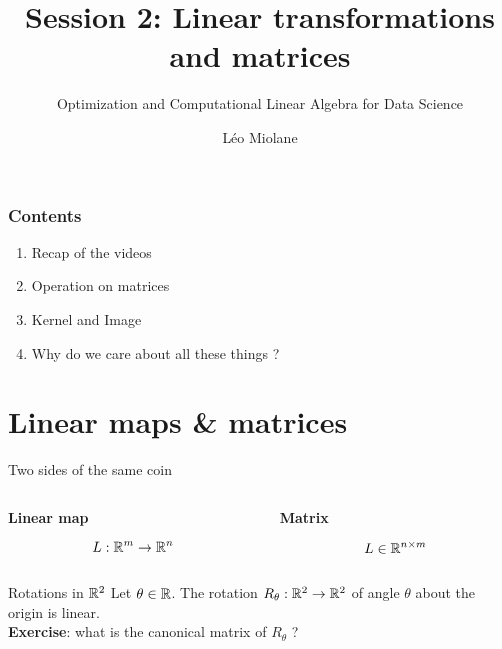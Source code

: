 \documentclass{beamer}
\title{Session 2: Linear transformations and matrices}
\subtitle{Optimization and Computational Linear Algebra for Data Science}
\author{Léo Miolane}
\date{}
\begin{document}
\setcounter{showProgressBar}{0}
\setcounter{showSlideNumbers}{0}

\frame{\titlepage}

\begin{frame}
	\frametitle{Contents}
	\begin{enumerate}
		\item Recap of the videos
		\item Operation on matrices
		\item Kernel and Image
		\item Why do we care about all these things ? 
	\end{enumerate}
\end{frame}


\setcounter{framenumber}{0}
\setcounter{showSlideNumbers}{1}

\section{Linear maps \& matrices}

\begin{frame}[t]{Two sides of the same coin}
	\begin{columns}
		\hspace{-0.85cm}
		\begin{column}{0.5\textwidth}
			\vspace{-0.5cm}
			\begin{center}
				\bf Linear map
			\end{center}
			$$
			L: \mathbb{R}^m \to \mathbb{R}^n
			$$
			\vspace{6cm}
		\end{column}
		\vrule
		\begin{column}{0.5\textwidth}
			\vspace{-0.5cm}
			\begin{center}
				\bf Matrix
			\end{center}
			$$
			L \in \mathbb{R}^{n \times m}
			$$
			\vspace{6cm}
		\end{column}
	\end{columns}
	\pause
\end{frame}

\begin{frame}[t]{Rotations in $\mathbb{R}^2$}
	Let $\theta \in \mathbb{R}$.
	The rotation $R_{\theta}: \mathbb{R}^2 \to \mathbb{R}^2$ of angle $\theta$ about the origin is linear.
	\\
	\vspace{0.3cm}
	\textbf{Exercise}: what is the canonical matrix of $R_{\theta}$ ?
\end{frame}
\end{document}
